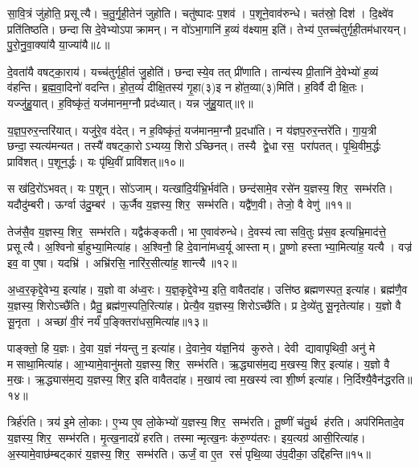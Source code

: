 सा॒वि॒त्रं जु॑होति॒ प्रसूत्यै। च॒तु॒र्गृ॒ही॒तेन॑ जुहोति। चतु॑ष्पादः प॒शव॑। प॒शूने॒वाव॑रुन्धे। चत॑स्रो॒ दिश॑। दि॒क्ष्वे॑व प्रति॑तिष्ठति। छन्दासि दे॒वेभ्योऽपाक्रामन्। न वो॑ऽभा॒गानि॑ ह॒व्यं व॑क्ष्याम॒ इति॑। तेभ्य॑ ए॒तच्च॑तुर्गृही॒तम॑धारयन्। पु॒रो॒नु॒वा॒क्या॑यै या॒ज्या॑यै॥८॥

दे॒वता॑यै वषट्का॒राय॑। यच्च॑तुर्गृही॒तं जु॒होति॑। छन्दास्ये॒व तत् प्री॑णाति। तान्य॑स्य प्री॒तानि॑ दे॒वेभ्यो॑ ह॒व्यं व॑हन्ति। ब्र॒ह्म॒वा॒दिनो॑ वदन्ति। हो॒त॒व्यं॑ दीक्षि॒तस्य॑ गृ॒हा(३)इ न हो॑त॒व्या(३)मिति॑। ह॒विर्\mbox{}वै दीक्षि॒तः। यज्जु॑हु॒यात्। ह॒विष्कृ॑तं॒ यज॑मानम॒ग्नौ प्रद॑ध्यात्। यन्न जु॑हु॒यात्॥९॥

य॒ज्ञ॒प॒रुर॒न्तरि॑यात्। यजु॑रे॒व व॑देत्। न ह॒विष्कृ॑तं॒ यज॑मानम॒ग्नौ प्र॒दधा॑ति। न य॑ज्ञप॒रुर॒न्तरे॑ति। गा॒य॒त्री छन्दा॒स्यत्य॑मन्यत। तस्यै॑ वषट्का॒रोऽभ्यय्य॒ शिरोऽच्छिनत्। तस्यै द्वे॒धा रस॒ परा॑पतत्। पृ॒थि॒वीम॒र्द्धः प्रावि॑शत्। प॒शून॒र्द्धः। यः पृ॑थि॒वीं प्रावि॑शत्॥१०॥

स ख॑दि॒रो॑ऽभवत्। यः प॒शून्। सो॑ऽजाम्। यत्खा॑दि॒र्यभ्रि॒र्भ\-व॑ति। छन्द॑सामे॒व रसे॑न य॒ज्ञस्य॒ शिर॒ सम्भ॑रति। यदौदु॑म्बरी। ऊर्ग्वा उ॑दु॒म्बर॑। ऊ॒र्जैव य॒ज्ञस्य॒ शिर॒ सम्भ॑रति। यद्वै॑ण॒वी। तेजो॒ वै वेणु॑॥११॥

तेज॑सै॒व य॒ज्ञस्य॒ शिर॒ सम्भ॑रति। यद्वैक॑ङ्कती। भा ए॒वाव॑रुन्धे। दे॒वस्य॑ त्वा सवि॒तुः प्र॑स॒व इत्यभ्रि॒माद॑त्ते॒ प्रसूत्यै। अ॒श्विनोर्बा॒हुभ्या॒\-मित्या॑ह। अ॒श्विनौ॒ हि दे॒वाना॑मध्व॒र्यू आस्ताम्। पू॒ष्णो हस्ताभ्या॒मित्या॑ह॒ यत्यै। वज्र॑ इव॒ वा ए॒षा। यदभ्रि॑। अभ्रि॑रसि॒ नारि॑र॒सीत्या॑ह॒ शान्त्यै॥१२॥

अ॒ध्व॒र॒कृद्दे॒वेभ्य॒ इत्या॑ह। य॒ज्ञो वा अ॑ध्व॒रः। य॒ज्ञ॒कृद्दे॒वेभ्य॒ इति॒ वावैतदा॑ह। उत्ति॑ष्ठ ब्रह्मणस्पत॒ इत्या॑ह। ब्रह्म॑णै॒व य॒ज्ञस्य॒ शिरोऽच्छै॑ति। प्रैतु॒ ब्रह्म॑ण॒स्पति॒रित्या॑ह। प्रेत्यै॒व य॒ज्ञस्य॒ शिरोऽच्छै॑ति। प्र दे॒व्ये॑तु सू॒नृतेत्या॑ह। य॒ज्ञो वै सू॒नृता। अच्छा॑ वी॒रं नर्यं॑ प॒ङ्क्तिरा॑धस॒मित्या॑ह॥१३॥

पाङ्क्तो॒ हि य॒ज्ञः। दे॒वा य॒ज्ञं न॑यन्तु न॒ इत्या॑ह। दे॒वाने॒व य॑ज्ञ॒निय॑ कुरुते। देवी द्यावापृथिवी॒ अनु॑ मे मसाथा॒मित्या॑ह। आ॒भ्यामे॒वानु॑मतो य॒ज्ञस्य॒ शिर॒ सम्भ॑रति। ऋ॒द्ध्यास॑म॒द्य म॒खस्य॒ शिर॒ इत्या॑ह। य॒ज्ञो वै म॒खः। ऋ॒द्ध्यास॑म॒द्य य॒ज्ञस्य॒ शिर॒ इति वावैतदा॑ह। म॒खाय॑ त्वा म॒खस्य॑ त्वा शी॒र्ष्ण इत्या॑ह। नि॒र्दिश्यै॒वैन॑द्धरति॥१४॥

त्रिर्\mbox{}ह॑रति। त्रय॑ इ॒मे लो॒काः। ए॒भ्य ए॒व लो॒केभ्यो॑ य॒ज्ञस्य॒ शिर॒ सम्भ॑रति। तू॒ष्णीं च॑तु॒र्थ ह॑रति। अप॑रिमितादे॒व य॒ज्ञस्य॒ शिर॒ सम्भ॑रति। मृ॒त्ख॒नादग्रे॑ हरति। तस्मान्मृत्ख॒नः क॑रु॒ण्य॑तरः। इय॒त्यग्र॑ आसी॒रित्या॑ह। अ॒स्यामे॒वाछ॑म्बट्कारं य॒ज्ञस्य॒ शिर॒ सम्भ॑रति। ऊर्जं॒ वा ए॒त रसं॑ पृथि॒व्या उ॑प॒दीका॒ उद्दि॑हन्ति॥१५॥

